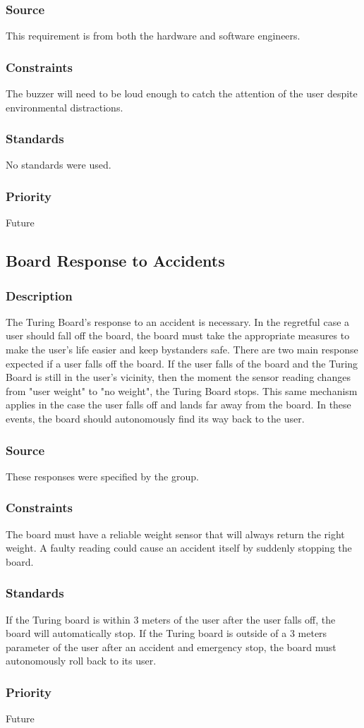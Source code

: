 \subsubsection{Source}
This requirement is from both the hardware and software engineers.
\subsubsection{Constraints}
The buzzer will need to be loud enough to catch the attention of the user despite environmental distractions.
\subsubsection{Standards}
No standards were used.
\subsubsection{Priority}
Future

\subsection{Board Response to Accidents}
\subsubsection{Description}
The Turing Board's response to an accident is necessary. In the regretful case a user should fall off the board, the board must take the appropriate measures to make the user's life easier and keep bystanders safe. There are two main response expected if a user falls off the board. If the user falls of the board and the Turing Board is still in the user's vicinity, then the moment the sensor reading changes from "user weight" to "no weight", the Turing Board stops. This same mechanism applies in the case the user falls off and lands far away from the board. In these events, the board should autonomously find its way back to the user.
\subsubsection{Source}
These responses were specified by the group.
\subsubsection{Constraints}
The board must have a reliable weight sensor that will always return the right weight. A faulty reading could cause an accident itself by suddenly stopping the board.
\subsubsection{Standards}
If the Turing board is within 3 meters of the user after the user falls off, the board will automatically stop.\hfill \break
If the Turing board is outside of a 3 meters parameter of the user after an accident and emergency stop, the board must autonomously roll back to its user. 
\subsubsection{Priority}
Future
